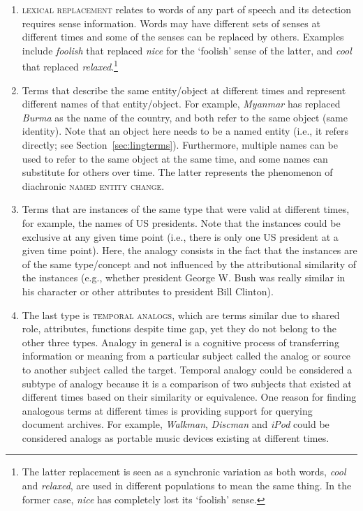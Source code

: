 \documentclass[output=paper]{langsci/langscibook}
\begin{document}
\begin{enumerate}[label=(\arabic*)]
\item \textsc{lexical replacement} relates to words of any part of speech and its detection requires sense information. Words may have different sets of senses at different times and some of the senses can be replaced by others. Examples include 
\emph{foolish} that replaced \emph{nice} for the `foolish' sense of the latter, and \emph{cool} that replaced \emph{relaxed}.\footnote{The latter replacement is seen as a synchronic variation as both words, \emph{cool} and \emph{relaxed}, are used in different populations to mean the same thing. In the former case, \emph{nice} has completely lost its `foolish' sense. } 

\item Terms that describe the same entity/object at different times and represent different names of that entity/object. For example, \emph{Myanmar} has replaced \emph{Burma} as the name of the country, and both refer to the same object (same identity). Note that an object here needs to be a named entity (i.e., it refers directly; see Section~\ref{sec:lingterms}). Furthermore, multiple names can be used to refer to the same object at the same time, and some names can substitute for others over time. The latter represents the phenomenon of diachronic \textsc{named entity change}.

\item Terms that are instances of the same type that were valid at different times, for example, the names of US presidents. Note that the instances could be exclusive at any given time point (i.e., there is only one US president at a given time point). Here, the analogy consists in the fact that the instances are of the same type/concept and not influenced by the attributional similarity of the instances (e.g., whether president George W. Bush was really similar in his character or other attributes to president Bill Clinton). 

\item The last type is \textsc{temporal analogs}, which are terms similar due to shared role, attributes, functions despite time gap, yet they do not belong to the other three types. Analogy in general is a cognitive process of transferring information or meaning from a particular subject called the analog or source to another subject called the target. Temporal analogy could be considered a subtype of analogy because it is a comparison of two subjects that existed at different times based on their similarity or equivalence. One reason for finding analogous terms at different times is providing support for querying document archives.  For example, \textit{Walkman}, \textit{Discman} and \textit{iPod} could be considered analogs as portable music devices existing at different times. 

\end{enumerate}
\end{document}
